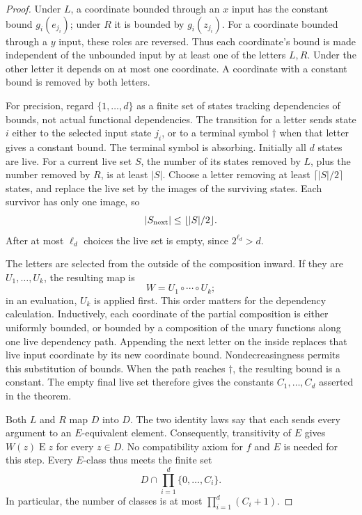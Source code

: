 \begin{proof}
Under $L$, a coordinate bounded through an $x$ input has the constant
bound $g_i(e_{j_i})$; under $R$ it is bounded by $g_i(z_{j_i})$.
For a coordinate bounded through a $y$ input, these roles are reversed.
Thus each coordinate's bound is made independent of the unbounded
input by at least one of the letters $L,R$. Under the other letter it
depends on at most one coordinate. A coordinate with a constant bound
is removed by both letters.

For precision, regard $\{1,\ldots,d\}$ as a finite set of states
tracking dependencies of bounds, not actual functional dependencies.
The transition for a letter sends state $i$ either to the
selected input state $j_i$, or to a terminal symbol $\dagger$ when
that letter gives a constant bound. The terminal symbol is absorbing.
Initially all $d$ states are live. For a current live set $S$, the
number of its states removed by $L$, plus the number removed by $R$,
is at least $|S|$. Choose a letter removing at least
$\lceil|S|/2\rceil$ states, and replace the live set by the images
of the surviving states. Each survivor has only one image, so
\[
                     |S_{\rm next}|\leq\lfloor|S|/2\rfloor.
\]
After at most $\ell_d$ choices the live set is empty, since
$2^{\ell_d}>d$.

The letters are selected from the outside of the composition inward.
If they are $U_1,\ldots,U_k$, the resulting map is
\[
                     W=U_1\circ\cdots\circ U_k;
\]
in an evaluation, $U_k$ is applied first. This order matters for the
dependency calculation. Inductively, each coordinate of the partial
composition is either uniformly bounded, or bounded by a composition
of the unary functions along one live dependency path. Appending the
next letter on the inside replaces that live input coordinate by its
new coordinate bound. Nondecreasingness permits this substitution of
bounds. When the path reaches $\dagger$, the resulting bound is a
constant. The empty final live set therefore gives the constants
$C_1,\ldots,C_d$ asserted in the theorem.

Both $L$ and $R$ map $D$ into $D$. The two identity laws say that
each sends every argument to an $E$-equivalent element. Consequently,
transitivity of $E$ gives $W(z)\mathrel E z$ for every $z\in D$.
No compatibility axiom for $f$ and $E$ is needed for this step.
Every $E$-class thus meets the finite set
\[
               D\cap\prod_{i=1}^d\{0,\ldots,C_i\}.
\]
In particular, the number of classes is at most
$\prod_{i=1}^d(C_i+1)$.
\end{proof}

